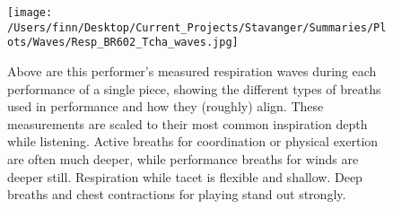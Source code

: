 \begin{figure}[h]
\begin{center}
\texttt{[image: /Users/finn/Desktop/Current\_Projects/Stavanger/Summaries/Plots/Waves/Resp\_BR602\_Tcha\_waves.jpg]}
\caption{Above are this performer's measured respiration waves during each performance of a single piece, showing the different types of breaths used in performance and how they (roughly) align.  These measurements are scaled to their most common inspiration depth while listening. Active breaths for coordination or physical exertion are often much deeper, while performance breaths for winds are deeper still. Respiration while tacet is flexible and shallow. Deep breaths and chest contractions for playing stand out strongly.}
\label{Waves}
\end{center}
\end{figure}
